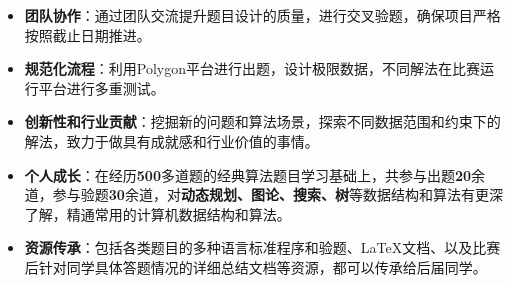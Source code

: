 \documentclass{resume}
\begin{document}
\begin{itemize}
	\item \textbf{团队协作}：通过团队交流提升题目设计的质量，进行交叉验题，确保项目严格按照截止日期推进。
	\item \textbf{规范化流程}：利用Polygon平台进行出题，设计极限数据，不同解法在比赛运行平台进行多重测试。
	\item \textbf{创新性和行业贡献}：挖掘新的问题和算法场景，探索不同数据范围和约束下的解法，致力于做具有成就感和行业价值的事情。
	\item \textbf{个人成长}：在经历\textbf{500}多道题的经典算法题目学习基础上，共参与出题\textbf{20}余道，参与验题\textbf{30}余道，对\textbf{动态规划、图论、搜索、树}等数据结构和算法有更深了解，精通常用的计算机数据结构和算法。
	\item \textbf{资源传承}：包括各类题目的多种语言标准程序和验题、LaTeX文档、以及比赛后针对同学具体答题情况的详细总结文档等资源，都可以传承给后届同学。
\end{itemize}



\end{document}
